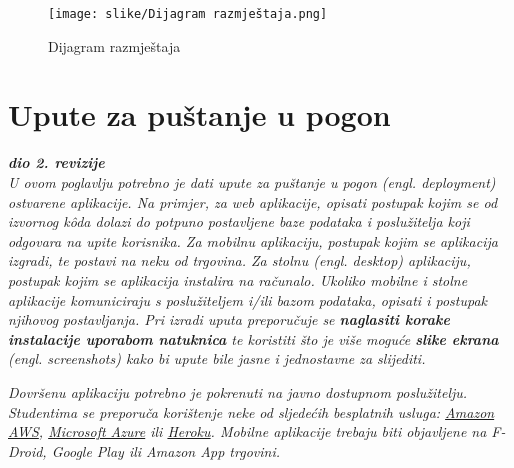             \begin{figure}[H]
             \centering
             \texttt{[image: slike/Dijagram razmještaja.png]}
             \caption{Dijagram razmještaja}
             \end{figure}
			\eject
		
		\section{Upute za puštanje u pogon}
		
			\textbf{\textit{dio 2. revizije}}\\
		
			 \textit{U ovom poglavlju potrebno je dati upute za puštanje u pogon (engl. deployment) ostvarene aplikacije. Na primjer, za web aplikacije, opisati postupak kojim se od izvornog kôda dolazi do potpuno postavljene baze podataka i poslužitelja koji odgovara na upite korisnika. Za mobilnu aplikaciju, postupak kojim se aplikacija izgradi, te postavi na neku od trgovina. Za stolnu (engl. desktop) aplikaciju, postupak kojim se aplikacija instalira na računalo. Ukoliko mobilne i stolne aplikacije komuniciraju s poslužiteljem i/ili bazom podataka, opisati i postupak njihovog postavljanja. Pri izradi uputa preporučuje se \textbf{naglasiti korake instalacije uporabom natuknica} te koristiti što je više moguće \textbf{slike ekrana} (engl. screenshots) kako bi upute bile jasne i jednostavne za slijediti.}
			
			
			 \textit{Dovršenu aplikaciju potrebno je pokrenuti na javno dostupnom poslužitelju. Studentima se preporuča korištenje neke od sljedećih besplatnih usluga: \href{https://aws.amazon.com/}{Amazon AWS}, \href{https://azure.microsoft.com/en-us/}{Microsoft Azure} ili \href{https://www.heroku.com/}{Heroku}. Mobilne aplikacije trebaju biti objavljene na F-Droid, Google Play ili Amazon App trgovini.}
			
			
			\eject 
